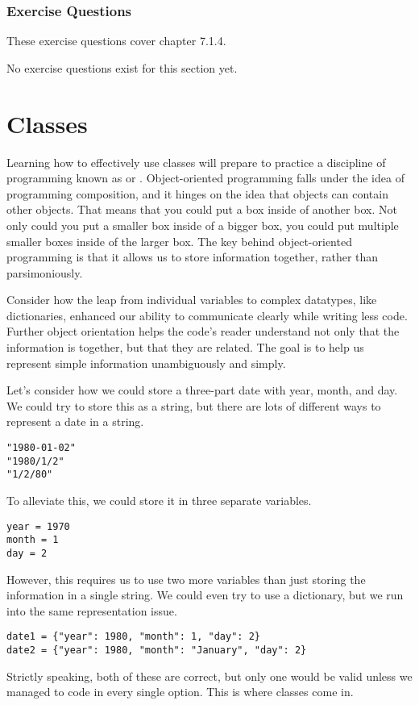 \subsubsection*{Exercise Questions}
These exercise questions cover chapter 7.1.4.

No exercise questions exist for this section yet.
\section{Classes}
Learning how to effectively use classes will prepare to practice a discipline of programming known as  or . Object-oriented programming falls under the idea of programming composition, and it hinges on the idea that objects can contain other objects. That means that you could put a box inside of another box. Not only could you put a smaller box inside of a bigger box, you could put multiple smaller boxes inside of the larger box. The key behind object-oriented programming is that it allows us to store information together, rather than parsimoniously.\par
Consider how the leap from individual variables to complex datatypes, like dictionaries, enhanced our ability to communicate clearly while writing less code. Further object orientation helps the code's reader understand not only that the information is together, but that they are related. The goal is to help us represent simple information unambiguously and simply.\par
Let's consider how we could store a three-part date with year, month, and day. We could try to store this as a string, but there are lots of different ways to represent a date in a string.
\begin{lstlisting}[style=pippython]
"1980-01-02"
"1980/1/2"
"1/2/80"
\end{lstlisting}
To alleviate this, we could store it in three separate variables.
\begin{lstlisting}[style=pippython]
year = 1970
month = 1
day = 2
\end{lstlisting}
However, this requires us to use two more variables than just storing the information in a single string. We could even try to use a dictionary, but we run into the same representation issue.
\begin{lstlisting}[style=pippython]
date1 = {"year": 1980, "month": 1, "day": 2}
date2 = {"year": 1980, "month": "January", "day": 2}
\end{lstlisting}
Strictly speaking, both of these are correct, but only one would be valid unless we managed to code in every single option. This is where classes come in.
